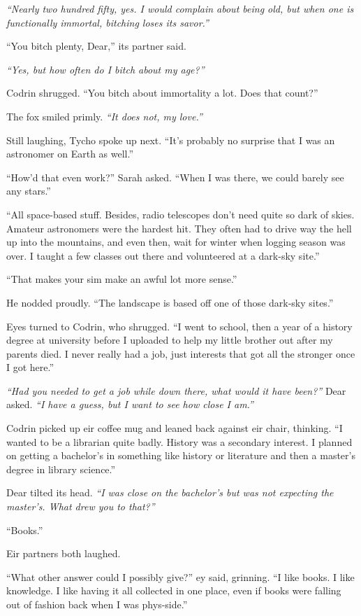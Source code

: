 \emph{``Nearly two hundred fifty, yes. I would complain about being old, but when one is functionally immortal, bitching loses its savor.''}

``You bitch plenty, Dear,'' its partner said.

\emph{``Yes, but how often do I bitch about my age?''}

Codrin shrugged. ``You bitch about immortality a lot. Does that count?''

The fox smiled primly. \emph{``It does not, my love.''}

Still laughing, Tycho spoke up next. ``It's probably no surprise that I was an astronomer on Earth as well.''

``How'd that even work?'' Sarah asked. ``When I was there, we could barely see any stars.''

``All space-based stuff. Besides, radio telescopes don't need quite so dark of skies. Amateur astronomers were the hardest hit. They often had to drive way the hell up into the mountains, and even then, wait for winter when logging season was over. I taught a few classes out there and volunteered at a dark-sky site.''

``That makes your sim make an awful lot more sense.''

He nodded proudly. ``The landscape is based off one of those dark-sky sites.''

Eyes turned to Codrin, who shrugged. ``I went to school, then a year of a history degree at university before I uploaded to help my little brother out after my parents died. I never really had a job, just interests that got all the stronger once I got here.''

\emph{``Had you needed to get a job while down there, what would it have been?''} Dear asked. \emph{``I have a guess, but I want to see how close I am.''}

Codrin picked up eir coffee mug and leaned back against eir chair, thinking. ``I wanted to be a librarian quite badly. History was a secondary interest. I planned on getting a bachelor's in something like history or literature and then a master's degree in library science.''

Dear tilted its head. \emph{``I was close on the bachelor's but was not expecting the master's. What drew you to that?''}

``Books.''

Eir partners both laughed.

``What other answer could I possibly give?'' ey said, grinning. ``I like books. I like knowledge. I like having it all collected in one place, even if books were falling out of fashion back when I was phys-side.''

